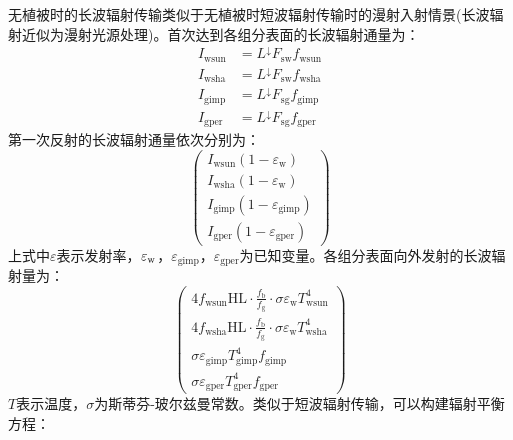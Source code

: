 无植被时的长波辐射传输类似于无植被时短波辐射传输时的漫射入射情景(长波辐射近似为漫射光源处理)。首次达到各组分表面的长波辐射通量为：
\begin{equation}
  \begin{aligned} I_{\mathrm{wsun}} &=L ^\downarrow F_{\mathrm{s w}} f_{\mathrm{wsun}} \\ I_{\mathrm{wsha}} &=L^\downarrow F_{\mathrm{s w}} f_{\mathrm{wsha}} \\ I_{\mathrm{gimp}} &=L^\downarrow F_{\mathrm{s g}} f_{\mathrm{gimp}} \\ I_{\mathrm{gper}} &=L^\downarrow F_{\mathrm{s g}} f_{\mathrm{gper}} \end{aligned}
\end{equation}
第一次反射的长波辐射通量依次分别为：
\begin{equation}
  \left(\begin{array}{c}I_{\mathrm{wsun}}\left(1-\varepsilon_{\mathrm{w}}\right) \\ I_{\mathrm{wsha}}\left(1-\varepsilon_{\mathrm{w}}\right) \\ I_{\mathrm{gimp}}\left(1-\varepsilon_{\mathrm{gimp}}\right) \\ I_{\mathrm{gper}}\left(1-\varepsilon_{\mathrm{gper}}\right)\end{array}\right)
\end{equation}
上式中$\varepsilon$表示发射率，$\varepsilon_{\rm w}$，$\varepsilon_{\mathrm{gimp}}$，$\varepsilon_{\mathrm{gper}}$为已知变量。各组分表面向外发射的长波辐射量为：
\begin{equation}
  \left(\begin{array}{c}4 f_{\mathrm{wsun}} \mathrm{HL} \cdot \frac{f_{\mathrm{b}}}{f_{\mathrm{g}}} \cdot \sigma \varepsilon_{\mathrm{w}} T_{\mathrm{wsun}}^{4} \\
    4 f_{\mathrm{wsha}} \mathrm{HL} \cdot \frac{f_{\mathrm{b}}}{f_{\mathrm{g}}} \cdot \sigma \varepsilon_{\mathrm{w}} T_{\mathrm{wsha}}^{4} \\
    \sigma \varepsilon_{\mathrm{gimp}} T_{\mathrm{gimp}}^{4} f_{\mathrm{gimp}} \\
  \sigma \varepsilon_{\mathrm{gper}} T_{\mathrm{gper}}^{4} f_{\mathrm{gper}}\end{array}\right)
\end{equation}
$T$表示温度，$\sigma$为斯蒂芬-玻尔兹曼常数。类似于短波辐射传输，可以构建辐射平衡方程：

